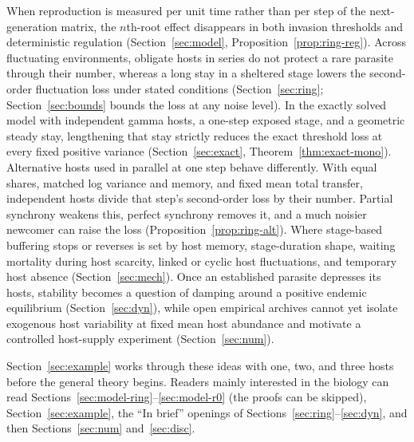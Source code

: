 When reproduction is measured per unit time rather than per step of the next-generation matrix, the $n$th-root effect disappears in both invasion thresholds and deterministic regulation (Section~\ref{sec:model}, Proposition~\ref{prop:ring-reg}). Across fluctuating environments, obligate hosts in series do not protect a rare parasite through their number, whereas a long stay in a sheltered stage lowers the second-order fluctuation loss under stated conditions (Section~\ref{sec:ring}; Section~\ref{sec:bounds} bounds the loss at any noise level). In the exactly solved model with independent gamma hosts, a one-step exposed stage, and a geometric steady stay, lengthening that stay strictly reduces the exact threshold loss at every fixed positive variance (Section~\ref{sec:exact}, Theorem~\ref{thm:exact-mono}). Alternative hosts used in parallel at one step behave differently. With equal shares, matched log variance and memory, and fixed mean total transfer, independent hosts divide that step's second-order loss by their number. Partial synchrony weakens this, perfect synchrony removes it, and a much noisier newcomer can raise the loss (Proposition~\ref{prop:ring-alt}). Where stage-based buffering stops or reverses is set by host memory, stage-duration shape, waiting mortality during host scarcity, linked or cyclic host fluctuations, and temporary host absence (Section~\ref{sec:mech}). Once an established parasite depresses its hosts, stability becomes a question of damping around a positive endemic equilibrium (Section~\ref{sec:dyn}), while open empirical archives cannot yet isolate exogenous host variability at fixed mean host abundance and motivate a controlled host-supply experiment (Section~\ref{sec:num}).

Section~\ref{sec:example} works through these ideas with one, two, and three hosts before the general theory begins. Readers mainly interested in the biology can read Sections~\ref{sec:model-ring}--\ref{sec:model-r0} (the proofs can be skipped), Section~\ref{sec:example}, the ``In brief'' openings of Sections~\ref{sec:ring}--\ref{sec:dyn}, and then Sections~\ref{sec:num} and~\ref{sec:disc}.
